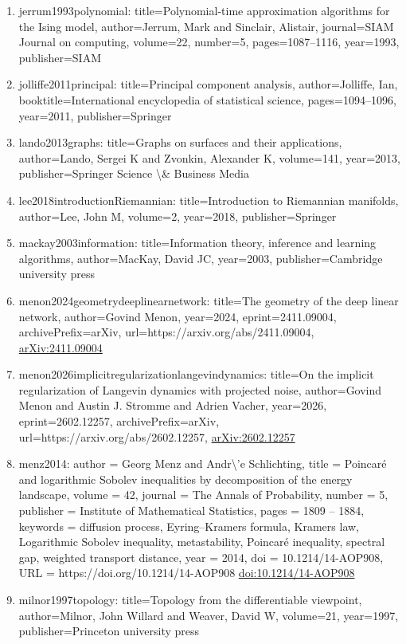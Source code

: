 \documentclass[11pt]{article}
\begin{document}
\begin{enumerate}[leftmargin=*]
  \item jerrum1993polynomial: title=Polynomial-time approximation algorithms for the Ising model, author=Jerrum, Mark and Sinclair, Alistair, journal=SIAM Journal on computing, volume=22, number=5, pages=1087--1116, year=1993, publisher=SIAM
  \item jolliffe2011principal: title=Principal component analysis, author=Jolliffe, Ian, booktitle=International encyclopedia of statistical science, pages=1094--1096, year=2011, publisher=Springer
  \item lando2013graphs: title=Graphs on surfaces and their applications, author=Lando, Sergei K and Zvonkin, Alexander K, volume=141, year=2013, publisher=Springer Science \textbackslash{}\& Business Media
  \item lee2018introductionRiemannian: title=Introduction to Riemannian manifolds, author=Lee, John M, volume=2, year=2018, publisher=Springer
  \item mackay2003information: title=Information theory, inference and learning algorithms, author=MacKay, David JC, year=2003, publisher=Cambridge university press
  \item menon2024geometrydeeplinearnetwork: title=The geometry of the deep linear network, author=Govind Menon, year=2024, eprint=2411.09004, archivePrefix=arXiv, url=https://arxiv.org/abs/2411.09004, \href{https://arxiv.org/abs/2411.09004}{arXiv:2411.09004}
  \item menon2026implicitregularizationlangevindynamics: title=On the implicit regularization of Langevin dynamics with projected noise, author=Govind Menon and Austin J. Stromme and Adrien Vacher, year=2026, eprint=2602.12257, archivePrefix=arXiv, url=https://arxiv.org/abs/2602.12257, \href{https://arxiv.org/abs/2602.12257}{arXiv:2602.12257}
  \item menz2014: author = Georg Menz and Andr\textbackslash{}'e Schlichting, title = Poincaré and logarithmic Sobolev inequalities by decomposition of the energy landscape, volume = 42, journal = The Annals of Probability, number = 5, publisher = Institute of Mathematical Statistics, pages = 1809 -- 1884, keywords = diffusion process, Eyring--Kramers formula, Kramers law, Logarithmic Sobolev inequality, metastability, Poincaré inequality, spectral gap, weighted transport distance, year = 2014, doi = 10.1214/14-AOP908, URL = https://doi.org/10.1214/14-AOP908 \href{https://doi.org/10.1214/14-AOP908}{doi:10.1214/14-AOP908}
  \item milnor1997topology: title=Topology from the differentiable viewpoint, author=Milnor, John Willard and Weaver, David W, volume=21, year=1997, publisher=Princeton university press

\end{enumerate}
\end{document}
